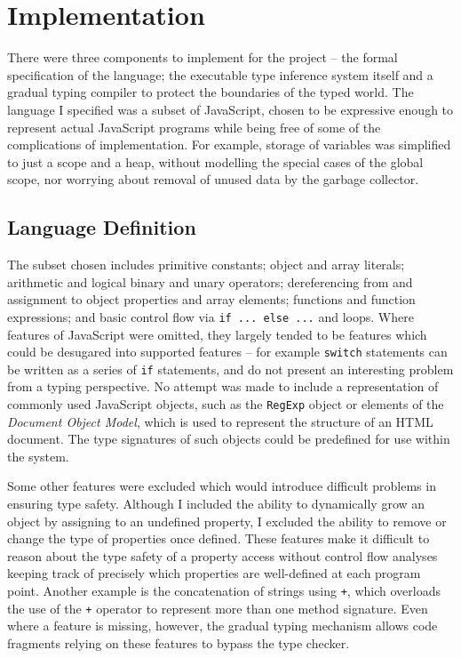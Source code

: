\documentclass[12pt,a4paper,twoside,openright]{report}
\theoremstyle{definition}
\theoremstyle{dotless}
\newcommand*{\js}{\texttt}
\begin{document}
\chapter{Implementation}\label{implementation}

There were three components to implement for the project -- the formal
specification of the language; the executable type inference system itself and
a gradual typing compiler to protect the boundaries of the typed world.  The
language I specified was a subset of JavaScript, chosen to be expressive enough
to represent actual JavaScript programs while being free of some of the
complications of implementation. For example, storage of variables was
simplified to just a scope and a heap, without modelling the special cases of
the global scope, nor worrying about removal of unused data by the garbage
collector. 

\section{Language Definition}

The subset chosen includes primitive constants; object and array literals;
arithmetic and logical binary and unary operators; dereferencing from and
assignment to object properties and array elements; functions and function expressions; and basic control flow via \js{if ... else ...} and loops.  
Where features of JavaScript were omitted, they largely tended to be features
which could be desugared into supported features -- for example \js{switch}
statements can be written as a series of \js{if} statements, and do not present
an interesting problem from a typing perspective. No attempt was made to
include a representation of commonly used JavaScript objects, such as the
\js{RegExp} object or elements of the \textit{Document Object Model}, which is used to
represent the structure of an HTML document. The type signatures of such objects
could be predefined for use within the system.

Some other features were excluded which would introduce difficult problems in
ensuring type safety.  Although I included the ability to dynamically grow an
object by assigning to an undefined property, I excluded the ability to remove
or change the type of properties once defined. These features
make it difficult to reason about the type safety of a property
access without control flow analyses keeping track of precisely which
properties are well-defined at each program point. Another example is the
concatenation of strings using \js{+}, which overloads the use of the \js{+}
operator to represent more than one method signature. Even where a feature is
missing, however, the gradual typing mechanism allows code fragments
relying on these features to bypass the type checker.
\end{document}
